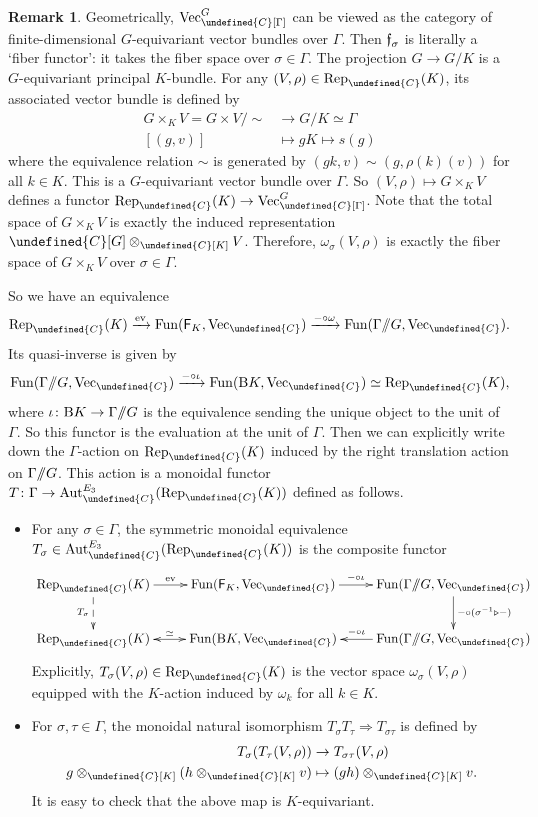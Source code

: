 \documentclass[10pt]{article}
\let\mathbb\undefined
\theoremstyle{definition}
\newtheorem{rem}[thm]{Remark}
\numberwithin{equation}{section}
\numberwithin{thm}{section}
\newcommand{\bit}{\begin{itemize}}
\newcommand{\eit}{\end{itemize}}
\newcommand{\Cb}{\mathbb{C}}
\newcommand{\SF}{\mathsf{F}}
\newcommand{\rmB}{\mathrm{B}}
\DeclareMathOperator{\Aut}{Aut}
\DeclareMathOperator{\ev}{ev}
\DeclareMathOperator{\fun}{Fun}
\newcommand{\forget}{\text{\usefont{U}{euf}{m}{n}f}}
\newcommand{\vect}{\mathrm{Vec}}
\newcommand{\rep}{\mathrm{Rep}}
\newcommand{\dquotient}{/\mkern-6mu/}
\begin{document}
\begin{rem}
Geometrically, $\vect_\Cb[\Gamma]^G$ can be viewed as the category of finite-dimensional $G$-equivariant vector bundles over $\Gamma$. Then $\forget_\sigma$ is literally a `fiber functor': it takes the fiber space over $\sigma \in \Gamma$. The projection $G \to G/K$ is a $G$-equivariant principal $K$-bundle. For any $(V,\rho) \in \rep_\Cb(K)$, its associated vector bundle is defined by
\begin{align*}
G \times_K V = G \times V / \sim & \to G/K \simeq \Gamma \\
[(g,v)] & \mapsto gK \mapsto s(g) 
\end{align*}
where the equivalence relation $\sim$ is generated by $(gk,v) \sim (g,\rho(k)(v))$ for all $k \in K$. This is a $G$-equivariant vector bundle over $\Gamma$. So $(V,\rho) \mapsto G \times_K V$ defines a functor $\rep_\Cb(K) \to \vect_\Cb[\Gamma]^G$. Note that the total space of $G \times_K V$ is exactly the induced representation $\Cb[G] \otimes_{\Cb[K]} V$. Therefore, $\omega_\sigma(V,\rho)$ is exactly the fiber space of $G \times_K V$ over $\sigma \in \Gamma$.
\end{rem}

So we have an equivalence
\[
\rep_\Cb(K) \xrightarrow{\ev} \fun(\SF_K,\vect_\Cb) \xrightarrow{- \circ \omega} \fun(\Gamma \dquotient G,\vect_\Cb) .
\]
Its quasi-inverse is given by
\[
\fun(\Gamma \dquotient G,\vect_\Cb) \xrightarrow{- \circ \iota} \fun(\rmB K,\vect_\Cb) \simeq \rep_\Cb(K) ,
\]
where $\iota \colon \rmB K \to \Gamma \dquotient G$ is the equivalence sending the unique object to the unit of $\Gamma$. So this functor is the evaluation at the unit of $\Gamma$. Then we can explicitly write down the $\Gamma$-action on $\rep_\Cb(K)$ induced by the right translation action on $\Gamma \dquotient G$. This action is a monoidal functor $T \colon \Gamma \to \Aut_\Cb^{E_3}(\rep_\Cb(K))$ defined as follows.
\bit
\item For any $\sigma \in \Gamma$, the symmetric monoidal equivalence $T_\sigma \in \Aut_\Cb^{E_3}(\rep_\Cb(K))$ is the composite functor
\[
\xymatrix{
\rep_\Cb(K) \ar[r]^-{\ev} \ar@{-->}[d]_{T_\sigma} & \fun(\SF_K,\vect_\Cb) \ar[r]^-{- \circ \iota} & \fun(\Gamma \dquotient G,\vect_\Cb) \ar[d]^{- \circ (\sigma^{-1} \triangleright -)} \\
\rep_\Cb(K) & \fun(\rmB K,\vect_\Cb) \ar@{<->}[l]_-{\simeq} & \fun(\Gamma \dquotient G,\vect_\Cb) \ar[l]_-{- \circ \iota}
}
\]
Explicitly, $T_\sigma(V,\rho) \in \rep_\Cb(K)$ is the vector space $\omega_\sigma(V,\rho)$ equipped with the $K$-action induced by $\omega_k$ for all $k \in K$.
\item For $\sigma,\tau \in \Gamma$, the monoidal natural isomorphism $T_\sigma T_\tau \Rightarrow T_{\sigma \tau}$ is defined by
\begin{align*}
T_\sigma(T_\tau(V,\rho)) & \to T_{\sigma \tau}(V,\rho) \\
g \otimes_{\Cb[K]} (h \otimes_{\Cb[K]} v) & \mapsto (gh) \otimes_{\Cb[K]} v .
\end{align*}
It is easy to check that the above map is $K$-equivariant.
\eit
\end{document}
